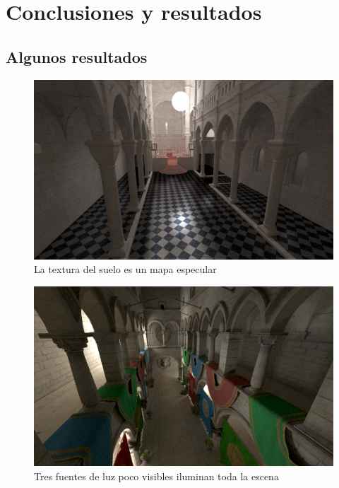 \chapter{Conclusiones y resultados}

\section{Algunos resultados}

\begin{figure}[h]
\centering
\includegraphics[width=5in]{sibenik_specular.png}
\caption{La textura del suelo es un mapa especular}
\end{figure}

\begin{figure}
\centering
\includegraphics[width=5in]{crytek_sponza1.png}
\caption{Tres fuentes de luz poco visibles iluminan toda la escena}
\end{figure}


